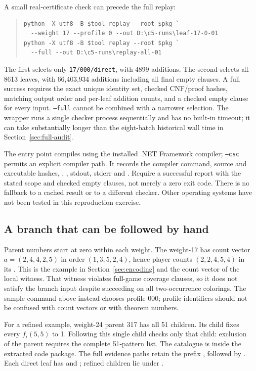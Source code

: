 A small real-certificate check can precede the full replay:
\begin{quote}\small
\begin{verbatim}
python -X utf8 -B $tool replay --root $pkg `
  --weight 17 --profile 0 --out D:\c5-runs\leaf-17-0-01
python -X utf8 -B $tool replay --root $pkg `
  --full --out D:\c5-runs\replay-all-01
\end{verbatim}
\end{quote}
The first selects only \texttt{17/000/direct}, with 4899 additions.
The second selects all 8613 leaves, with 66,403,934 additions including
all final empty clauses. A full success requires the exact unique
identity set, checked CNF/proof hashes, matching output order and
per-leaf addition counts, and a checked empty clause for every input.
\texttt{--full} cannot be combined with a narrower selection. The
wrapper runs a single checker process sequentially and has no built-in
timeout; it can take substantially longer than the eight-batch historical
wall time in Section~\ref{sec:full-audit}.

The entry point compiles  using the
installed .NET Framework compiler; \texttt{--csc} permits an explicit
compiler path. It records the compiler command, source and executable
hashes, , , stdout, stderr and
. Require a successful report with the stated
scope and checked empty clauses, not merely a zero exit code. There is
no fallback to a cached result or to a different checker. Other operating
systems have not been tested in this reproduction exercise.

\subsection{A branch that can be followed by hand}
Parent numbers start at zero within each weight. The weight-17
 has count vector $a=(2,4,4,2,5)$ in order
$(1,3,5,2,4)$, hence player counts $(2,2,4,5,4)$ in its
. This is the example in
Section~\ref{sec:encoding} and the count vector of the local witness.
That witness violates full-game coverage clauses, so it does not satisfy
the branch input despite succeeding on all two-occurrence colorings.
The sample command above instead chooses profile 000; profile identifiers
should not be confused with count vectors or with theorem numbers.

For a refined example, weight-24 parent 317 has all 51 children.
Its child  fixes every $f_i(5,5)$ to 1. Following this
single child checks only that child: exclusion of the parent requires
the complete 51-pattern list. The catalogue is
 inside the extracted code
package. The full evidence paths retain the prefix
, followed by
. Each direct leaf has
 and ; refined children lie under
.

